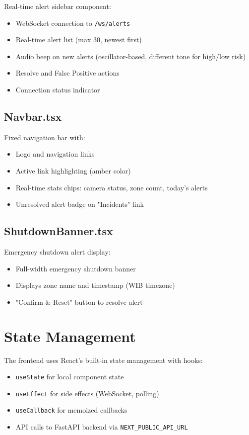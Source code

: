 \documentclass[12pt,a4paper,oneside]{book}
\begin{document}
Real-time alert sidebar component:
\begin{itemize}
    \item WebSocket connection to \texttt{/ws/alerts}
    \item Real-time alert list (max 30, newest first)
    \item Audio beep on new alerts (oscillator-based, different tone for high/low risk)
    \item Resolve and False Positive actions
    \item Connection status indicator
\end{itemize}

\subsection{Navbar.tsx}

Fixed navigation bar with:
\begin{itemize}
    \item Logo and navigation links
    \item Active link highlighting (amber color)
    \item Real-time stats chips: camera status, zone count, today's alerts
    \item Unresolved alert badge on "Incidents" link
\end{itemize}

\subsection{ShutdownBanner.tsx}

Emergency shutdown alert display:
\begin{itemize}
    \item Full-width emergency shutdown banner
    \item Displays zone name and timestamp (WIB timezone)
    \item "Confirm \& Reset" button to resolve alert
\end{itemize}

\section{State Management}

The frontend uses React's built-in state management with hooks:
\begin{itemize}
    \item \texttt{useState} for local component state
    \item \texttt{useEffect} for side effects (WebSocket, polling)
    \item \texttt{useCallback} for memoized callbacks
    \item API calls to FastAPI backend via \texttt{NEXT\_PUBLIC\_API\_URL}
\end{itemize}
\end{document}
